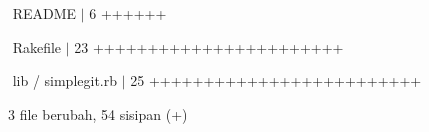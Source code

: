 \noindent 
 $  $ \hspace*{0.5in}  \hspace*{0.5in} README  $  \vert  $ 6 ++++++ \par
\noindent 
 \hspace*{0.5in}  $  $ \hspace*{0.5in} Rakefile  $  \vert  $ 23 +++++++++++++++++++++++ \par
\noindent 
 $  $ \hspace*{0.5in}  \hspace*{0.5in} lib / simplegit.rb  $  \vert  $ 25 +++++++++++++++++++++++++ \par
\noindent 
 \hspace*{0.5in}  \hspace*{0.5in}  $  $3 file berubah, 54 sisipan (+) \par

